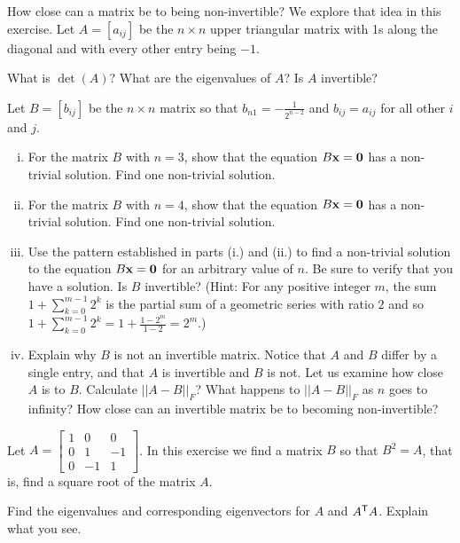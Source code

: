 \item How close can a matrix be to being non-invertible? We explore that idea in this exercise. Let $A = [a_{ij}]$ be the $n \times n$ upper triangular matrix with 1s along the diagonal and with every other entry being $-1$. 
	\ba
	\item What is $\det(A)$? What are the eigenvalues of $A$? Is $A$ invertible?  


	\item Let $B = [b_{ij}]$ be the $n \times n$ matrix so that $b_{n1} = -\frac{1}{2^{n-2}}$ and $b_{ij} = a_{ij}$ for all other $i$ and $j$. 
		\begin{enumerate}[i.]
		\item For the matrix $B$ with $n=3$, show that the equation $B \mathbf{x} = \mathbf{0}$ has a non-trivial solution. Find one non-trivial solution. 
	
		\item For the matrix $B$ with $n=4$, show that the equation $B \mathbf{x} = \mathbf{0}$ has a non-trivial solution. Find one non-trivial solution. 
	

		\item Use the pattern established in parts (i.) and (ii.) to find a non-trivial solution to the equation $B \mathbf{x} = \mathbf{0}$ for an arbitrary value of $n$. Be sure to verify that you have a solution. Is $B$ invertible? (Hint: For any positive integer $m$, the sum  $1+\sum_{k=0}^{m-1} 2^k$ is the partial sum of a geometric series with ratio $2$ and so $1+\sum_{k=0}^{m-1} 2^k  = 1+\frac{1-2^m}{1-2} = 2^m$.)

		\item Explain why $B$ is not an invertible matrix. Notice that $A$ and $B$ differ by a single entry, and that $A$ is invertible and $B$ is not. Let us examine how close $A$ is to $B$. Calculate $|| A - B ||_F$? What happens to $||A - B||_F$ as $n$ goes to infinity? How close can an invertible matrix be to becoming non-invertible? 

		\end{enumerate}

	\ea
 
 \item Let $A = \left[ \begin{array}{crr} 1&0&0 \\ 0&1&-1 \\ 0&-1&1 \end{array} \right]$. In this exercise we find a matrix $B$ so that $B^2 = A$, that is, find a square root of the matrix $A$. 
	\ba
	\item Find the eigenvalues and corresponding eigenvectors for $A$ and $A^{\mathsf{T}}A$. Explain what you see. 
	
